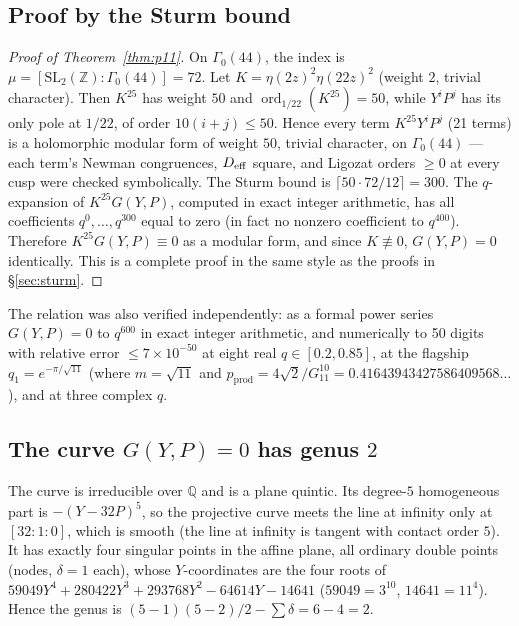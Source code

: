 \documentclass[11pt]{amsart}
\theoremstyle{plain}
\theoremstyle{definition}
\theoremstyle{remark}
\newcommand{\Z}{\mathbb{Z}}
\newcommand{\Q}{\mathbb{Q}}
\newcommand{\pprod}{p_{\mathrm{prod}}}
\begin{document}
\subsection{Proof by the Sturm bound}

\begin{proof}[Proof of Theorem~\ref{thm:p11}]
On $\Gamma_0(44)$, the index is $\mu = [\mathrm{SL}_2(\Z):\Gamma_0(44)] = 72$.
Let $K = \eta(2z)^2\eta(22z)^2$ (weight $2$, trivial character). Then $K^{25}$ has
weight $50$ and $\operatorname{ord}_{1/22}(K^{25}) = 50$, while $Y^iP^j$ has its
only pole at $1/22$, of order $10(i+j) \leq 50$. Hence every term
$K^{25}Y^iP^j$ (21 terms) is a holomorphic modular form of weight $50$, trivial
character, on $\Gamma_0(44)$ --- each term's Newman congruences, $D_{\rm eff}$
square, and Ligozat orders $\geq 0$ at every cusp were checked symbolically.
The Sturm bound is $\lceil 50\cdot 72/12\rceil = 300$. The $q$-expansion of
$K^{25}G(Y,P)$, computed in exact integer arithmetic, has all coefficients
$q^0,\dots,q^{300}$ equal to zero (in fact no nonzero coefficient to $q^{400}$).
Therefore $K^{25}G(Y,P) \equiv 0$ as a modular form, and since $K \not\equiv 0$,
$G(Y,P) = 0$ identically. This is a complete proof in the same style as the
proofs in \S\ref{sec:sturm}.
\end{proof}

The relation was also verified independently: as a formal power series
$G(Y,P) = 0$ to $q^{600}$ in exact integer arithmetic, and numerically to 50
digits with relative error $\leq 7\times 10^{-50}$ at eight real $q \in
[0.2, 0.85]$, at the flagship $q_1 = e^{-\pi/\sqrt{11}}$ (where $m = \sqrt{11}$
and $\pprod = 4\sqrt{2}/G_{11}^{10} = 0.41643943427586409568\dots$), and at three
complex $q$.

\subsection{The curve $G(Y,P) = 0$ has genus $2$}

The curve is irreducible over $\Q$ and is a plane quintic. Its degree-$5$
homogeneous part is $-(Y-32P)^5$, so the projective curve meets the line at
infinity only at $[32:1:0]$, which is smooth (the line at infinity is tangent
with contact order $5$). It has exactly four singular points in the affine plane,
all ordinary double points (nodes, $\delta = 1$ each), whose $Y$-coordinates are
the four roots of $59049Y^4 + 280422Y^3 + 293768Y^2 - 64614Y - 14641$
($59049 = 3^{10}$, $14641 = 11^4$). Hence the genus is
$(5-1)(5-2)/2 - \sum\delta = 6 - 4 = 2$.
\end{document}
